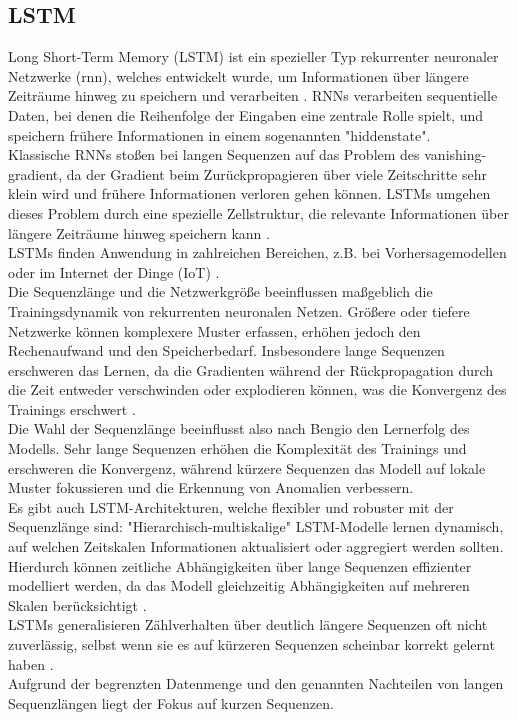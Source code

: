 \documentclass[a4paper,12pt]{article}
\begin{document}
	\subsection{LSTM}
	Long Short-Term Memory (LSTM) ist ein spezieller Typ rekurrenter neuronaler Netzwerke (\gls{rnn}), welches entwickelt wurde, um Informationen über längere Zeiträume hinweg zu speichern und verarbeiten \cite{hochreiter1997long}. RNNs verarbeiten sequentielle Daten, bei denen die Reihenfolge der Eingaben eine zentrale Rolle spielt, und speichern frühere Informationen in einem sogenannten "\gls{hiddenstate}".
	\\[0.5em]
	Klassische RNNs stoßen bei langen Sequenzen auf das Problem des \gls{vanishing-gradient}, da der Gradient beim Zurückpropagieren über viele Zeitschritte sehr klein wird und frühere Informationen verloren gehen können. LSTMs umgehen dieses Problem durch eine spezielle Zellstruktur, die relevante Informationen über längere Zeiträume hinweg speichern kann \cite[S.19]{staudemeyer2019understanding}.
	\\[0.5em]
	LSTMs finden Anwendung in zahlreichen Bereichen, z.B. bei Vorhersagemodellen oder im Internet der Dinge (IoT) \cite{wei2022lstm}.
	\\[0.5em]
	Die Sequenzlänge und die Netzwerkgröße beeinflussen maßgeblich die Trainingsdynamik von rekurrenten neuronalen Netzen. Größere oder tiefere Netzwerke können komplexere Muster erfassen, erhöhen jedoch den Rechenaufwand und den Speicherbedarf. Insbesondere lange Sequenzen erschweren das Lernen, da die Gradienten während der Rückpropagation durch die Zeit entweder verschwinden oder explodieren können, was die Konvergenz des Trainings erschwert \cite{bengio1994learning}.
	\\[0.5em]
	Die Wahl der Sequenzlänge beeinflusst also nach Bengio den Lernerfolg des Modells. Sehr lange Sequenzen erhöhen die Komplexität des Trainings und erschweren die Konvergenz, während kürzere Sequenzen das Modell auf lokale Muster fokussieren und die Erkennung von Anomalien verbessern.
	\\[0.5em]
	Es gibt auch LSTM-Architekturen, welche flexibler und robuster mit der Sequenzlänge sind: "Hierarchisch-multiskalige" LSTM-Modelle lernen dynamisch, auf welchen Zeitskalen Informationen aktualisiert oder aggregiert werden sollten. Hierdurch können zeitliche Abhängigkeiten über lange Sequenzen effizienter modelliert werden, da das Modell gleichzeitig Abhängigkeiten auf mehreren Skalen berücksichtigt \cite{chung2017hierarchical}.
	\\[0.5em]
	LSTMs generalisieren Zählverhalten über deutlich längere Sequenzen oft nicht zuverlässig, selbst wenn sie es auf kürzeren Sequenzen scheinbar korrekt gelernt haben \cite{elnaggar2022counting}.
	\\[0.5em]
	Aufgrund der begrenzten Datenmenge und den genannten Nachteilen von langen Sequenzlängen liegt der Fokus auf kurzen Sequenzen. 
		
\end{document}
